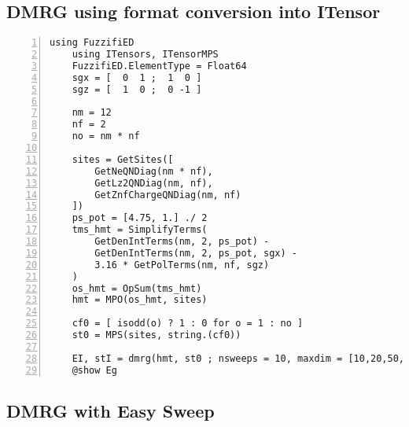 \documentclass{timesjhep}
\begin{document}
\subsection{DMRG using format conversion into ITensor}

\begin{lstlisting}[numbers=left]
    using FuzzifiED
    using ITensors, ITensorMPS
    FuzzifiED.ElementType = Float64
    sgx = [  0  1 ;  1  0 ]
    sgz = [  1  0 ;  0 -1 ]

    nm = 12
    nf = 2
    no = nm * nf

    sites = GetSites([
        GetNeQNDiag(nm * nf), 
        GetLz2QNDiag(nm, nf),
        GetZnfChargeQNDiag(nm, nf)
    ])
    ps_pot = [4.75, 1.] ./ 2
    tms_hmt = SimplifyTerms(
        GetDenIntTerms(nm, 2, ps_pot) - 
        GetDenIntTerms(nm, 2, ps_pot, sgx) - 
        3.16 * GetPolTerms(nm, nf, sgz)
    )
    os_hmt = OpSum(tms_hmt)
    hmt = MPO(os_hmt, sites)

    cf0 = [ isodd(o) ? 1 : 0 for o = 1 : no ]
    st0 = MPS(sites, string.(cf0))

    EI, stI = dmrg(hmt, st0 ; nsweeps = 10, maxdim = [10,20,50,100,200,500], noise = [1E-4,3E-5,1E-5,3E-6,1E-6,3E-7], cutoff = [1E-8])
    @show Eg
\end{lstlisting}

\subsection{DMRG with Easy Sweep}
\end{document}
